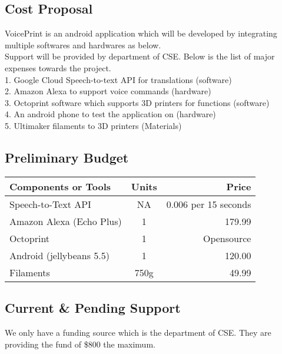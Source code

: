 \subsection{Cost Proposal}
VoicePrint is an android application which will be developed by integrating multiple softwares and hardwares as below.
\\
Support will be provided by department of CSE. Below is the list of major expenses towards the project.
\\
1. Google Cloud Speech-to-text API for translations (software)
\\
2. Amazon Alexa to support voice commands (hardware)
\\
3. Octoprint software which supports 3D printers for functions (software)
\\
4. An android phone to test the application on (hardware)
\\
5. Ultimaker filaments to 3D printers (Materials)

\subsection{Preliminary Budget}
\begin{tabular}{|l|c|r|}
	\hline
    Components or Tools & Units & Price\\
    \hline
    \hline
	Speech-to-Text API & NA & 0.006 per 15 seconds\\
	\hline
	Amazon Alexa (Echo Plus) & 1 & 179.99\\
	\hline
	Octoprint & 1 & Opensource\\
	\hline
	Android (jellybeans 5.5) & 1 & 120.00\\
	\hline
	Filaments & 750g & 49.99\\
	\hline
\end{tabular}

\subsection{Current \& Pending Support}
We only have a funding source which is the department of CSE. They are providing the fund of \$800 the maximum. \\